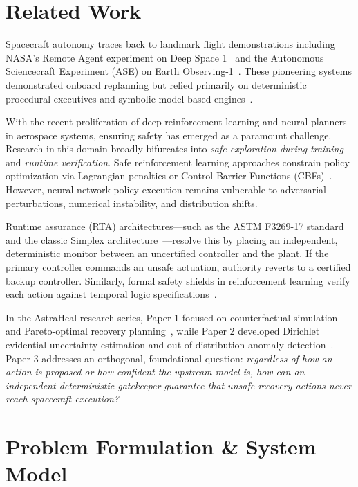 \documentclass[conference]{IEEEtran}
\begin{document}
\section{Related Work}

Spacecraft autonomy traces back to landmark flight demonstrations including NASA's Remote Agent experiment on Deep Space 1~\cite{muscettola1998remote} and the Autonomous Sciencecraft Experiment (ASE) on Earth Observing-1~\cite{chien2005autonomous}. These pioneering systems demonstrated onboard replanning but relied primarily on deterministic procedural executives and symbolic model-based engines~\cite{williams1996model}.

With the recent proliferation of deep reinforcement learning and neural planners in aerospace systems, ensuring safety has emerged as a paramount challenge. Research in this domain broadly bifurcates into \textit{safe exploration during training} and \textit{runtime verification}. Safe reinforcement learning approaches constrain policy optimization via Lagrangian penalties or Control Barrier Functions (CBFs)~\cite{ames2016control}. However, neural network policy execution remains vulnerable to adversarial perturbations, numerical instability, and distribution shifts.

Runtime assurance (RTA) architectures—such as the ASTM F3269-17 standard and the classic Simplex architecture~\cite{sha2001using}—resolve this by placing an independent, deterministic monitor between an uncertified controller and the plant. If the primary controller commands an unsafe actuation, authority reverts to a certified backup controller. Similarly, formal safety shields in reinforcement learning verify each action against temporal logic specifications~\cite{alshiekh2018safe}.

In the AstraHeal research series, Paper 1 focused on counterfactual simulation and Pareto-optimal recovery planning~\cite{thambisetty2026astraheal}, while Paper 2 developed Dirichlet evidential uncertainty estimation and out-of-distribution anomaly detection~\cite{astraheal2026paper2}. Paper 3 addresses an orthogonal, foundational question: \textit{regardless of how an action is proposed or how confident the upstream model is, how can an independent deterministic gatekeeper guarantee that unsafe recovery actions never reach spacecraft execution?}

\section{Problem Formulation \& System Model}
\end{document}
